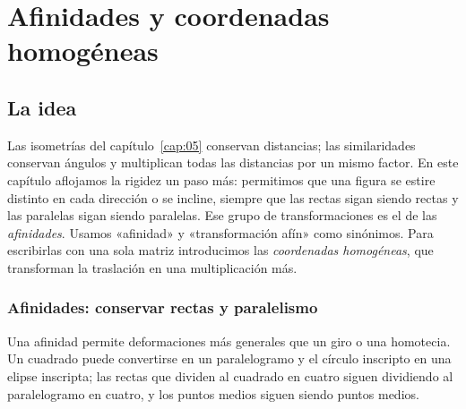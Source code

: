 \chapter{Afinidades y coordenadas homogéneas}\label{cap:06}

\section{La idea}

Las isometrías del capítulo~\ref{cap:05} conservan distancias; las similaridades conservan
ángulos y multiplican todas las distancias por un mismo factor. En este capítulo aflojamos
la rigidez un paso más: permitimos que una figura se estire distinto en cada dirección o se
incline, siempre que las rectas sigan siendo rectas y las paralelas sigan siendo paralelas.
Ese grupo de transformaciones es el de las \emph{afinidades}. Usamos «afinidad» y
«transformación afín» como sinónimos. Para escribirlas con una sola matriz introducimos las
\emph{coordenadas homogéneas}, que transforman la traslación en una multiplicación más.

\subsection{Afinidades: conservar rectas y paralelismo}\label{sec:afinidades-primera}

{\small\vspace{1mm}\par}

Una afinidad permite deformaciones más generales que un giro o una homotecia. Un cuadrado
puede convertirse en un paralelogramo y el círculo inscripto en una elipse inscripta; las
rectas que dividen al cuadrado en cuatro siguen dividiendo al paralelogramo en cuatro, y los
puntos medios siguen siendo puntos medios.

